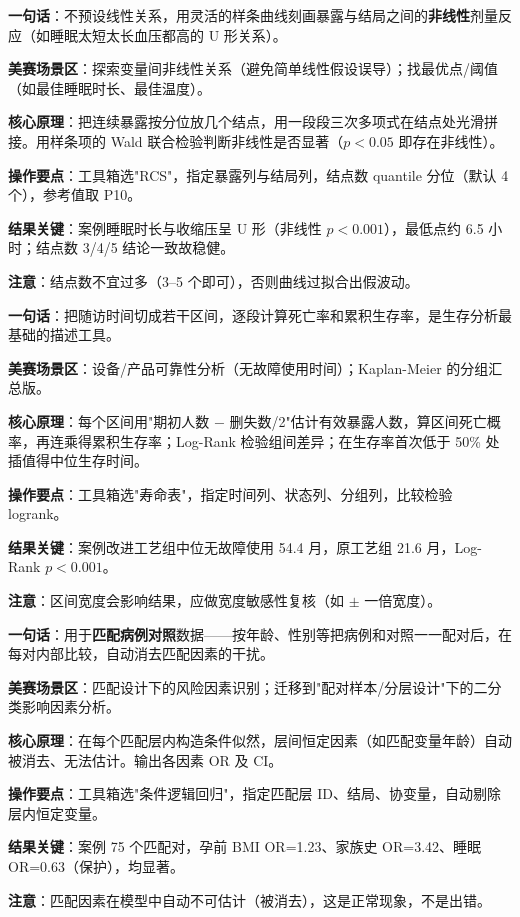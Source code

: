 
\begin{algobrief}
\textbf{一句话}：不预设线性关系，用灵活的样条曲线刻画暴露与结局之间的\textbf{非线性}剂量反应（如睡眠太短太长血压都高的 U 形关系）。

\textbf{美赛场景区}：探索变量间非线性关系（避免简单线性假设误导）；找最优点/阈值（如最佳睡眠时长、最佳温度）。

\textbf{核心原理}：把连续暴露按分位放几个结点，用一段段三次多项式在结点处光滑拼接。用样条项的 Wald 联合检验判断非线性是否显著（$p<0.05$ 即存在非线性）。

\textbf{操作要点}：工具箱选"RCS"，指定暴露列与结局列，结点数 quantile 分位（默认 4 个），参考值取 P10。

\textbf{结果关键}：案例睡眠时长与收缩压呈 U 形（非线性 $p<0.001$），最低点约 6.5 小时；结点数 3/4/5 结论一致故稳健。

\textbf{注意}：结点数不宜过多（3--5 个即可），否则曲线过拟合出假波动。
\end{algobrief}


\begin{algobrief}
\textbf{一句话}：把随访时间切成若干区间，逐段计算死亡率和累积生存率，是生存分析最基础的描述工具。

\textbf{美赛场景区}：设备/产品可靠性分析（无故障使用时间）；Kaplan-Meier 的分组汇总版。

\textbf{核心原理}：每个区间用"期初人数 $-$ 删失数/2"估计有效暴露人数，算区间死亡概率，再连乘得累积生存率；Log-Rank 检验组间差异；在生存率首次低于 50\% 处插值得中位生存时间。

\textbf{操作要点}：工具箱选"寿命表"，指定时间列、状态列、分组列，比较检验 logrank。

\textbf{结果关键}：案例改进工艺组中位无故障使用 54.4 月，原工艺组 21.6 月，Log-Rank $p<0.001$。

\textbf{注意}：区间宽度会影响结果，应做宽度敏感性复核（如 $\pm$ 一倍宽度）。
\end{algobrief}


\begin{algobrief}
\textbf{一句话}：用于\textbf{匹配病例对照}数据——按年龄、性别等把病例和对照一一配对后，在每对内部比较，自动消去匹配因素的干扰。

\textbf{美赛场景区}：匹配设计下的风险因素识别；迁移到"配对样本/分层设计"下的二分类影响因素分析。

\textbf{核心原理}：在每个匹配层内构造条件似然，层间恒定因素（如匹配变量年龄）自动被消去、无法估计。输出各因素 OR 及 CI。

\textbf{操作要点}：工具箱选"条件逻辑回归"，指定匹配层 ID、结局、协变量，自动剔除层内恒定变量。

\textbf{结果关键}：案例 75 个匹配对，孕前 BMI OR=1.23、家族史 OR=3.42、睡眠 OR=0.63（保护），均显著。

\textbf{注意}：匹配因素在模型中自动不可估计（被消去），这是正常现象，不是出错。
\end{algobrief}


